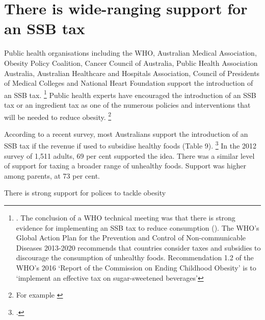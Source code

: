 \documentclass[embargoed]{grattan}
\begin{document}
\section{There is wide-ranging support for an SSB tax}\label{there-is-wide-ranging-support-for-an-ssb-tax}

Public health organisations including the WHO, Australian Medical Association, Obesity Policy Coalition, Cancer Council of Australia, Public Health Association Australia, Australian Healthcare and Hospitals Association, Council of Presidents of Medical Colleges and National Heart Foundation support the introduction of an SSB tax.%
\footnote{\textcites{Coalition2016Policybriefcase}{Health2016Insufficientphysicalactivity}{Health2016Insufficientphysicalactivity}.
The conclusion of a WHO technical meeting was that there is strong evidence for implementing an SSB tax to reduce consumption (\textcite{Organization2016FiscalPoliciesDiet}).
The WHO's Global Action Plan for the Prevention and Control of Non-communicable Diseases 2013-2020 recommends that countries consider taxes and subsidies to discourage the consumption of unhealthy foods.
Recommendation 1.2 of the WHO's 2016 `Report of the Commission on Ending Childhood Obesity' is to `implement an effective tax on sugar-sweetened beverages'} Public health experts have encouraged the introduction of an SSB tax or an ingredient tax as one of the numerous policies and interventions that will be needed to reduce obesity.%
\footnote{For example \textcites{Brownell2009Ouncespreventionthepublic}{Veerman2016ImpactTaxSugar}{Sharma2014effectstaxingsugarsweetened}{NiMhurchu2014Twentypercenttax}{Kaplin2013Usingeconomicpolicy}{Long2015Costeffectivenesssugar}{Cawley2015IncidenceTaxesSugar}}

According to a recent survey, most Australians support the introduction of an SSB tax if the revenue if used to subsidise healthy foods (Table 9).%
\footcite{Morley2012Publicopinionfood} In the 2012 survey of 1,511 adults, 69 per cent supported the idea.
There was a similar level of support for taxing a broader range of unhealthy foods.
Support was higher among parents, at 73 per cent. 

\begin{table}
\caption{There is strong support for polices to tackle obesity}




\end{table}
\end{document}
